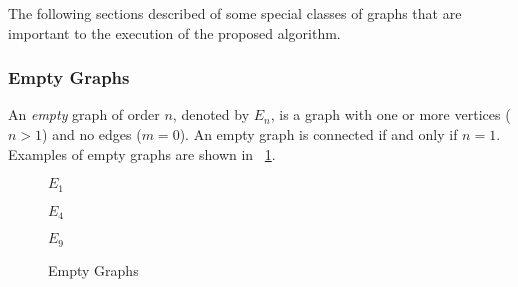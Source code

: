 The following sections described of some special classes of graphs that are important to the execution of the
proposed algorithm.

\subsubsection{Empty Graphs}\label{sec:sub:sub:empty}

An \emph{empty} graph of order \(n\), denoted by \(E_n\), is a graph with one or more vertices (\(n>1\)) and no
edges (\(m=0\)).  An empty graph is connected if and only if \(n=1\).  Examples of empty graphs are shown in
\figurename~\ref{fig:empty}.

\begin{figure}[H]
  \label{fig:empty}
  \begin{minipage}{1.5in}
    \begin{center}

      \bigskip

      \(E_1\)
    \end{center}
  \end{minipage}
  \begin{minipage}{2.5in}
    \begin{center}

      \bigskip

      \(E_4\)
    \end{center}
  \end{minipage}
  \begin{minipage}{2in}
    \begin{center}

      \bigskip

      \(E_9\)
    \end{center}
  \end{minipage}
  \caption{Empty Graphs}
\end{figure}

